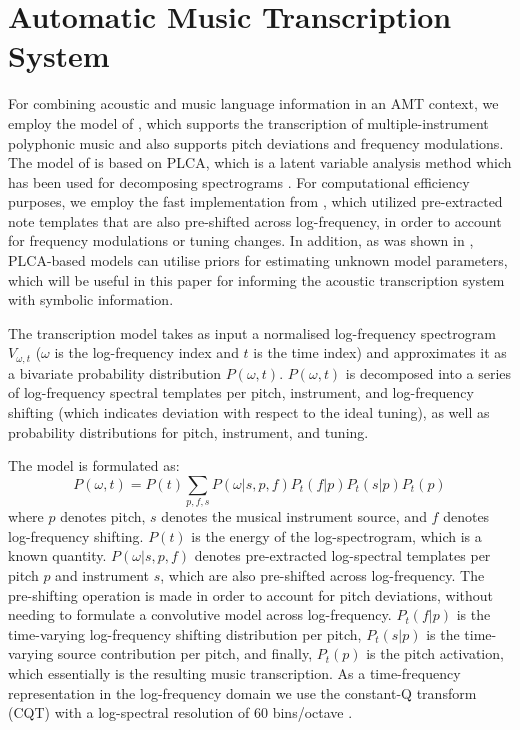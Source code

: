 \section{Automatic Music Transcription System} \label{sec:transcription}


For combining acoustic and music language information in an AMT context, we employ the model of \cite{Benetos2012}, which supports the transcription of multiple-instrument polyphonic music and also supports pitch deviations and frequency modulations. The model of \cite{Benetos2012} is based on PLCA, which is a latent variable analysis method which has been used for decomposing spectrograms \cite{Shashanka2008}.
For computational efficiency purposes, we employ the fast implementation from \cite{Benetos2013}, which utilized pre-extracted note templates that are also pre-shifted across log-frequency, in order to account for frequency modulations or tuning changes. In addition, as was shown in \cite{Smaragdis2009}, PLCA-based models can utilise priors for estimating unknown model parameters, which will be useful in this paper for informing the 
acoustic transcription system with symbolic information.

The transcription model takes as input a normalised log-frequency spectrogram $V_{\omega,t}$ ($\omega$ is the log-frequency index and $t$ is the time index) and approximates it as a bivariate probability distribution $P(\omega,t)$. $P(\omega,t)$ is decomposed into a series of log-frequency spectral templates per pitch, instrument, and log-frequency shifting (which indicates deviation with respect to the ideal tuning), as well as probability distributions for pitch, instrument, and tuning. 

The model is formulated as:
\begin{equation}
P(\omega,t) = P(t)\sum_{p,f,s}P(\omega|s,p,f)P_{t}(f|p)P_{t}(s|p)P_{t}(p) \label{eq:Model}
\end{equation} 
where $p$ denotes pitch, $s$ denotes the musical instrument source, and $f$ denotes log-frequency shifting. $P(t)$ is the energy of the log-spectrogram, which is a known quantity. $P(\omega|s,p,f)$ denotes pre-extracted log-spectral templates per pitch $p$ and instrument $s$, which are also pre-shifted across log-frequency. The pre-shifting operation is made in order to account for pitch deviations, without needing to formulate a convolutive model across log-frequency. $P_{t}(f|p)$ is the time-varying log-frequency shifting distribution per pitch, $P_{t}(s|p)$ is the time-varying source contribution per pitch, and finally, $P_{t}(p)$ is the pitch activation, which essentially is the resulting music transcription. As a time-frequency representation in the log-frequency domain we use the constant-Q transform (CQT) with a log-spectral resolution of 60 bins/octave \cite{Schoerkhuber10}.

